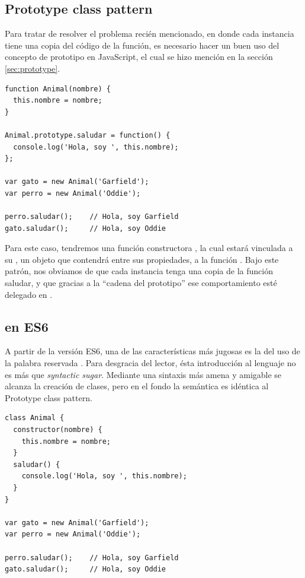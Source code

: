 \subsection{Prototype class pattern}

Para tratar de resolver el problema recién mencionado, en donde cada instancia tiene una copia del código de la función, es necesario hacer un buen uso del concepto de prototipo en JavaScript, el cual se hizo mención en la sección \ref{sec:prototype}.

\begin{lstlisting}[title={Prototype class pattern}]
function Animal(nombre) {
  this.nombre = nombre;
}

Animal.prototype.saludar = function() {
  console.log('Hola, soy ', this.nombre);
};

var gato = new Animal('Garfield');
var perro = new Animal('Oddie');

perro.saludar(); 	// Hola, soy Garfield
gato.saludar(); 	// Hola, soy Oddie
\end{lstlisting}

Para este caso, tendremos una función constructora , la cual estará vinculada a su \code{[[Prototype]]}, un objeto que contendrá entre sus propiedades, a la función . Bajo este patrón, nos obviamos de que cada instancia tenga una copia de la función saludar, y que gracias a la "`cadena del prototipo"' ese comportamiento esté delegado en .

\subsection{ en ES6}
\label{clasesenes6}

A partir de la versión ES6, una de las características más jugosas es la del uso de la palabra reservada . Para desgracia del lector, ésta introducción al lenguaje no es más que \textit{syntactic sugar}. Mediante una sintaxis más amena y amigable se alcanza la creación de clases, pero en el fondo la semántica es idéntica al Prototype class pattern.

\begin{lstlisting}[title={Ejemplo de \code{class}}]
class Animal {
  constructor(nombre) {
    this.nombre = nombre;
  }
  saludar() {
    console.log('Hola, soy ', this.nombre);
  }
}

var gato = new Animal('Garfield');
var perro = new Animal('Oddie');

perro.saludar(); 	// Hola, soy Garfield
gato.saludar(); 	// Hola, soy Oddie
\end{lstlisting}

